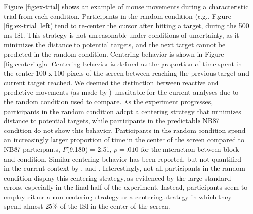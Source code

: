 \documentclass[man,floatsintext]{apa6}
\begin{document}
Figure \ref{fig:ex-trial} shows an example of mouse movements during a characteristic trial from each condition. Participants in the random condition (e.g., Figure \ref{fig:ex-trial} left) tend to re-center the cursor after hitting a target, during the 500 ms ISI. This strategy is not unreasonable under conditions of uncertainty, as it minimizes the distance to potential targets, and the next target cannot be predicted in the random condition. Centering behavior is shown in Figure \ref{fig:centering}a. Centering behavior is defined as the proportion of time spent in the center 100 x 100 pixels of the screen between reaching the previous target and current target reached. We deemed the distinction between reactive and predictive movements (as made by ) unsuitable for the current analyses due to the random condition used to compare. As the experiment progresses, participants in the random condition adopt a centering strategy that minimizes distance to potential targets, while participants in the predictable NB87 condition do not show this behavior. Participants in the random condition spend an increasingly larger proportion of time in the center of the screen compared to NB87 participants, $F$(9,180) = 2.51, $p = .010$ for the interaction between block and condition. Similar centering behavior has been reported, but not quantified in the current context by , and . Interestingly, not all participants in the random condition display this centering strategy, as evidenced by the large standard errors, especially in the final half of the experiment. Instead, participants seem to employ either a non-centering strategy or a centering strategy in which they spend almost 25\% of the ISI in the center of the screen.
\end{document}

